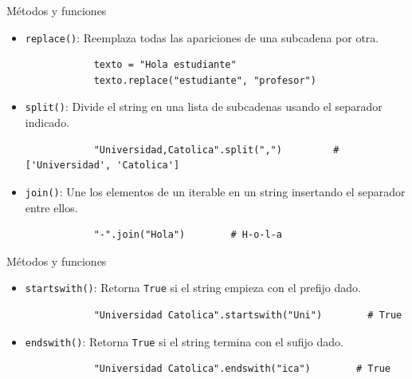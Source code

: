 \documentclass{beamer}
\begin{document}
    \begin{frame}[fragile,t]{Métodos y funciones}
        \begin{itemize}
            \item \texttt{replace()}: Reemplaza todas las apariciones de una subcadena por otra.
            \begin{verbatim}
            texto = "Hola estudiante"
            texto.replace("estudiante", "profesor")
            \end{verbatim}
            \item \texttt{split()}: Divide el string en una lista de subcadenas usando el separador indicado.
            \begin{verbatim}
            "Universidad,Catolica".split(",")         # ['Universidad', 'Catolica']
            \end{verbatim}
            \item \texttt{join()}: Une los elementos de un iterable en un string insertando el separador entre ellos.
            \begin{verbatim}
            "-".join("Hola")        # H-o-l-a
            \end{verbatim}
        \end{itemize}
    \end{frame}

    \begin{frame}[fragile,t]{Métodos y funciones}
        \begin{itemize}
            \item \texttt{startswith()}: Retorna \texttt{True} si el string empieza con el prefijo dado.
            \begin{verbatim}
            "Universidad Catolica".startswith("Uni")        # True
            \end{verbatim}
            \item \texttt{endswith()}: Retorna \texttt{True} si el string termina con el sufijo dado.
            \begin{verbatim}
            "Universidad Catolica".endswith("ica")        # True
            \end{verbatim}
        \end{itemize}
    \end{frame}
\end{document}
